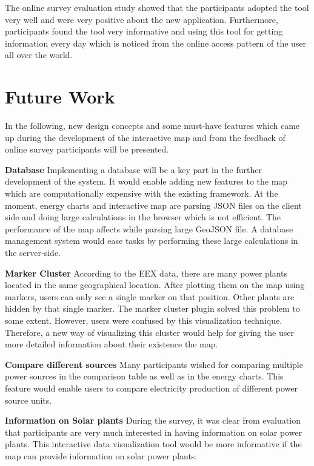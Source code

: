 The online survey evaluation study showed that the participants adopted the tool very well and were very positive about the new application. Furthermore, participants found the tool very informative and using this tool for getting information every day which is noticed from the online access pattern of the user all over the world.

\section*{Future Work}

In the following, new design concepts and some must-have features which came up during the development of the interactive map and from the feedback of online survey participants will be presented. 

\textbf{Database}
\newline
Implementing a database will be a key part in the further development of the system. It would enable adding new features to the map which are computationally expensive with the existing framework. At the moment, energy charts and interactive map are parsing JSON files on the client side and doing large calculations in the browser which is not efficient. The performance of the map affects while parsing large GeoJSON file. A database management system would ease tasks by performing these large calculations in the server-side.

\textbf{Marker Cluster}
\newline
According to the EEX data, there are many power plants located in the same geographical location. After plotting them on the map using markers, users can only see a single marker on that position. Other plants are hidden by that single marker. The marker cluster plugin solved this problem to some extent. However, users were confused by this visualization technique. Therefore, a new way of visualizing this cluster would help for giving the user more detailed information about their existence the map.

\textbf{Compare different sources}
\newline
Many participants wished for comparing multiple power sources in the comparison table as well as in the energy charts. This feature would enable users to compare electricity production of different power source units.

\textbf{Information on Solar plants}
\newline
During the survey, it was clear from evaluation that participants are very much interested in having information on solar power plants. This interactive data visualization tool would be more informative if the map can provide information on solar power plants. 


